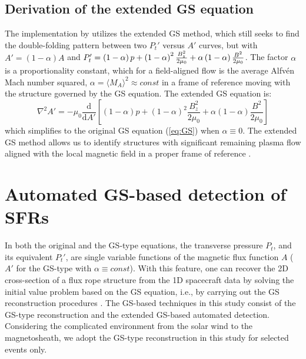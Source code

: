 \subsection{Derivation of the extended GS equation}
The implementation by \cite{Chen:2021} utilizes the extended GS method, which still seeks to find the double-folding pattern between two $P_t'$ versus $A'$ curves, but with $A'=(1-\alpha)A$ and $P_t'=\left( 1-\alpha \right)p + \left( 1-\alpha \right)^2\frac{B_z^2}{2\mu_0} + \alpha\left( 1-\alpha \right)\frac{B^2}{2\mu_0}$.  The factor $\alpha$ is a proportionality constant, which for a field-aligned flow is the average Alfv\'en Mach number squared, $\alpha=\langle M_A\rangle^2 \approx const$ in a frame of reference moving with the structure governed by the GS equation. The extended GS equation \citep{Teh:2018, Sonnerup:2006} is:
\begin{equation}
    \nabla^2 A' = -\mu_0\frac{\mathrm{d}}{\mathrm{d}A'}\left[\left(1-\alpha\right)p + \left(1-\alpha\right)^2\frac{B_z^2}{2\mu_0} + \alpha\left(1-\alpha\right)\frac{B^2}{2\mu_0} \right]
    \label{eq:GSextended}
\end{equation}
which simplifies to the original GS equation (\ref{eq:GS}) when $\alpha\equiv 0$. The extended GS method allows us to identify structures with significant remaining plasma ﬂow aligned with the local magnetic field in a proper frame of reference \citep{Chen:2022}.

\section{Automated GS-based detection of SFRs}
In both the original and the GS-type equations, the transverse pressure $P_t$, and its equivalent $P_t'$, are single variable functions of the magnetic flux function $A$ ($A'$ for the GS-type with $\alpha\equiv const$). With this feature, one can recover the 2D cross-section of a flux rope structure from the 1D spacecraft data by solving the initial value problem based on the GS equation, i.e., by carrying out the GS reconstruction procedures \citep{Hau:1999, HuSonnerup:2002, Hu:2017}. The GS-based techniques in this study consist of the GS-type reconstruction and the extended GS-based automated detection. Considering the complicated environment from the solar wind to the magnetosheath, we adopt the GS-type reconstruction in this study for selected events only.

